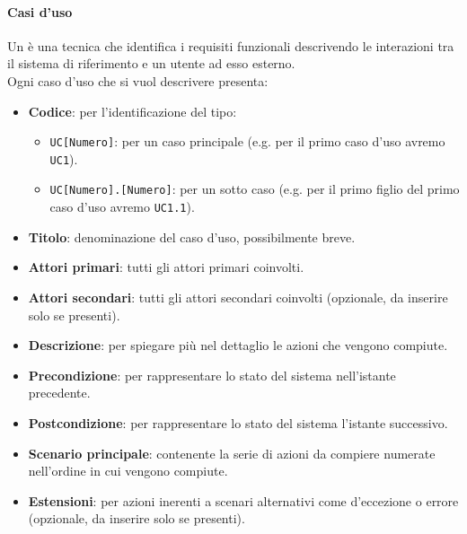 		\paragraph{Casi d'uso}\label{PP:Sviluppo:AdR:CasiUso}
		Un  è una tecnica che identifica i requisiti funzionali descrivendo le interazioni tra il sistema di riferimento e un utente ad esso esterno. \\
		Ogni caso d'uso che si vuol descrivere presenta:
		\begin{itemize}
		 	\item \textbf{Codice}: per l'identificazione del tipo:
		 	\begin{itemize}
		 		\item \texttt{UC[Numero]}: per un caso principale (e.g. per il primo caso d'uso avremo \texttt{UC1}).
		 		\item \texttt{UC[Numero].[Numero]}: per un sotto caso (e.g. per il primo figlio del primo caso d'uso avremo \texttt{UC1.1}).
		 	\end{itemize}
		 	\item \textbf{Titolo}: denominazione del caso d'uso, possibilmente breve.
		 	\item \textbf{Attori primari}: tutti gli attori primari coinvolti.
		 	\item \textbf{Attori secondari}: tutti gli attori secondari coinvolti (opzionale, da inserire solo se presenti).		 	
		 	\item \textbf{Descrizione}: per spiegare più nel dettaglio le azioni che vengono compiute.
		 	\item \textbf{Precondizione}: per rappresentare lo stato del sistema nell'istante precedente.
		 	\item \textbf{Postcondizione}: per rappresentare lo stato del sistema l'istante successivo.
		 	\item \textbf{Scenario principale}: contenente la serie di azioni da compiere numerate nell'ordine in cui vengono compiute.
		 	\item \textbf{Estensioni}: per azioni inerenti a scenari alternativi come d'eccezione o errore (opzionale, da inserire solo se presenti).
		\end{itemize}




